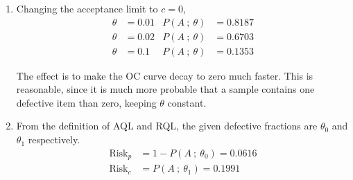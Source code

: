 \begin{enumerate}
    \item Changing the acceptance limit to $ c = 0 $,
          \begin{align}
              \theta & = 0.01 & P(A\ ;\ \theta) & = 0.8187 \\
              \theta & = 0.02 & P(A\ ;\ \theta) & = 0.6703 \\
              \theta & = 0.1  & P(A\ ;\ \theta) & = 0.1353
          \end{align}
          \begin{figure}[H]
              \centering
              \anitablethree
              \anitableone
          \end{figure}
          The effect is to make the OC curve decay to zero much faster. This is
          reasonable, since it is much more probable that a sample contains one defective
          item than zero, keeping $ \theta $ constant.

    \item From the definition of AQL and RQL, the given defective fractions are
          $ \theta_0 $ and $ \theta_1 $ respectively.
          \begin{align}
              \text{Risk}_p & = 1 - P(A\ ;\ \theta_0) = 0.0616 \\
              \text{Risk}_c & = P(A\ ;\ \theta_1) = 0.1991
          \end{align}


\end{enumerate}
